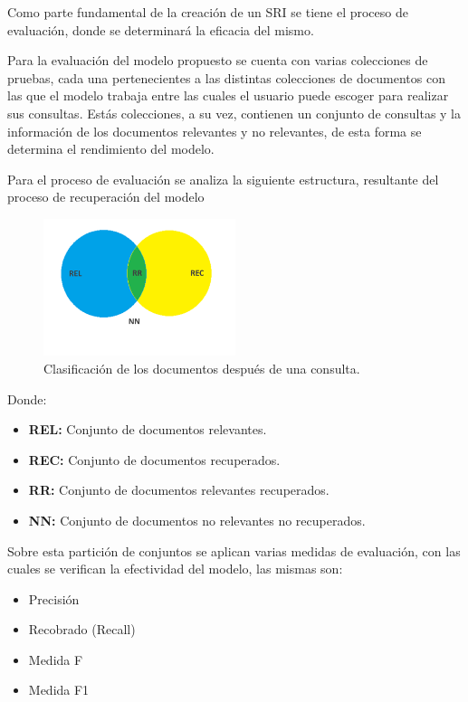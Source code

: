 Como parte fundamental de la creación de un SRI se tiene el proceso de
evaluación, donde se determinará la eficacia del mismo.

Para la evaluación del modelo propuesto se cuenta con varias colecciones de
pruebas, cada una pertenecientes a las distintas colecciones de documentos con
las que el modelo trabaja entre las cuales el usuario puede escoger para
realizar sus consultas. Estás colecciones, a su vez, contienen un conjunto de
consultas y la información de los documentos relevantes y no relevantes, de
esta forma se determina el rendimiento del modelo.

Para el proceso de evaluación se analiza la siguiente estructura, resultante
del proceso de recuperación del modelo

\begin{figure}[htb]%
	\begin{center}
		\includegraphics[width=0.5\textwidth]{./sri_03.png}
	\end{center}
	\caption{Clasificación de los documentos después de una consulta.}
	\label{fig:docSet}
\end{figure}

Donde:
\begin{itemize}
    \item {\bf REL:} Conjunto de documentos relevantes.
    \item {\bf REC:} Conjunto de documentos recuperados.
    \item {\bf RR:} Conjunto de documentos relevantes recuperados.
    \item {\bf NN:} Conjunto de documentos no relevantes no recuperados.
\end{itemize}

Sobre esta partición de conjuntos se aplican varias medidas de evaluación, con
las cuales se verifican la efectividad del modelo, las mismas son:

\begin{itemize}
    \item Precisión
    \item Recobrado (Recall)
    \item Medida F
    \item Medida F1
\end{itemize}

